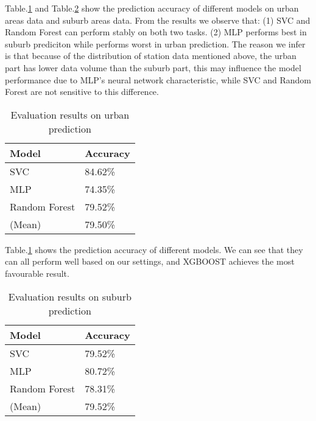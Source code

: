 Table.\ref{tab2} and Table.\ref{tab3} show the prediction accuracy of different models on urban areas data and suburb areas data. From the results we observe that: (1) SVC and Random Forest can perform stably on both two tasks. (2) MLP performs best in suburb prediciton while performs worst in urban prediction. The reason we infer is that because of the distribution of station data mentioned above, the urban part has lower data volume than the suburb part, this may influence the model performance due to MLP's neural network characteristic, while SVC and Random Forest are not sensitive to this difference.
\begin{table}[htbp]
	\caption{Evaluation results on urban prediction}
	\begin{center}
		\begin{tabular}{|l|l|}
			\hline
			Model & Accuracy\\
			\hline
			SVC & 84.62\%\\
			\hline
			MLP & 74.35\%\\
			\hline
			Random Forest & 79.52\%\\
			\hline
			(Mean) & 79.50\%\\
			\hline
		\end{tabular}
		\label{tab2}
	\end{center}
\end{table}
Table.\ref{tab2} shows the prediction accuracy of different models. We can see that they can all perform well based on our settings, and XGBOOST achieves the most favourable result.

\begin{table}[htbp]
	\caption{Evaluation results on suburb prediction}
	\begin{center}
		\begin{tabular}{|l|l|}
			\hline
			Model & Accuracy\\
			\hline
			SVC & 79.52\%\\
			\hline
			MLP & 80.72\%\\
			\hline
			Random Forest & 78.31\%\\
			\hline
			(Mean) & 79.52\%\\
			\hline
		\end{tabular}
		\label{tab3}
	\end{center}
\end{table}

